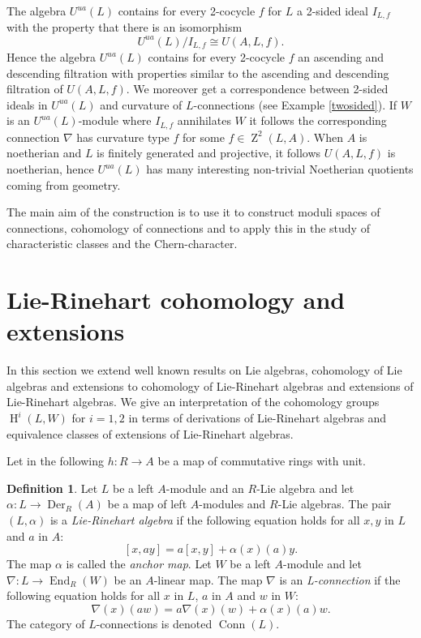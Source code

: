 \documentclass{amsart}
\theoremstyle{plain}
\theoremstyle{definition}
\newtheorem{definition}[theorem]{Definition}
\theoremstyle{remark}
\numberwithin{equation}{theorem}
\begin{document}
The algebra ${U^{ua}}(L)$ contains for every 2-cocycle $f$ for $L$ a 2-sided ideal 
$I_{L,f}$ with the property that there is an isomorphism
\[ {U^{ua}}(L)/I_{L,f}\cong U({A},L,f).\]
Hence the algebra ${U^{ua}}(L)$ contains for every 2-cocycle $f$ an ascending and descending 
filtration with properties similar to the ascending and descending filtration of $U({A},L,f)$. 
We moreover get a correspondence between 2-sided ideals in ${U^{ua}}(L)$ and curvature of $L$-connections (see Example 
\ref{twosided}). If $W$ is an ${U^{ua}}(L)$-module where $I_{L,f}$ annihilates $W$ it follows the corresponding connection
$\nabla$ has curvature type $f$ for some $f\in {\operatorname{Z}}^2(L,{A})$.
When ${A}$ is noetherian and $L$ is finitely generated and projective, it follows $U({A},L,f)$ is noetherian,
hence ${U^{ua}}(L)$ has many interesting non-trivial Noetherian quotients coming from geometry.

The main aim of the construction is to use it to construct moduli spaces of connections, cohomology of connections
and to apply this in the study of characteristic classes and the Chern-character.

\section{Lie-Rinehart cohomology and extensions}

In this section we extend well known results on Lie algebras, cohomology of Lie algebras and extensions to
cohomology of Lie-Rinehart algebras and extensions of Lie-Rinehart algebras. We give an interpretation of the 
cohomology groups ${\operatorname{H} }^i(L,W)$ for $i=1,2$ in terms of derivations of Lie-Rinehart algebras and equivalence
classes of extensions of Lie-Rinehart algebras. 

Let in the following $h:{R} \rightarrow {A}$ be a map of commutative rings with unit. 

\begin{definition}
Let $L$ be a left ${A}$-module and an ${R}$-Lie algebra and let 
$\alpha:L\rightarrow {\operatorname{Der} }_{R}({A})$ be a map of left ${A}$-modules and ${R}$-Lie algebras.
The pair $(L, \alpha)$ is a \emph{Lie-Rinehart algebra} if the following equation holds
for all $x,y$ in $L$ and $a$ in  ${A}$:
\[ [x,ay]=a[x,y]+\alpha(x)(a)y .\]
The map $\alpha$ is called the \emph{anchor map}.
Let $W$ be a left ${A}$-module and let $\nabla: L\rightarrow {\operatorname{End} }_{R}(W)$ be an ${A}$-linear map. 
The map $\nabla$ is an \emph{L-connection} if the following equation holds
for all $x$ in $L$, $a$ in ${A}$ and $w$ in $W$:
\[ \nabla(x)(aw)=a\nabla(x)(w)+\alpha(x)(a)w.\]
The category of $L$-connections is denoted ${\operatorname{Conn}}(L)$.
\end{definition}
\end{document}
